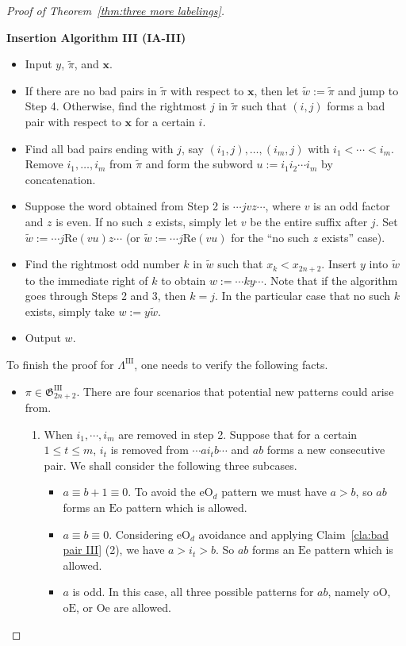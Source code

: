 \documentclass[11pt,reqno]{amsart}
\numberwithin{equation}{section}
\theoremstyle{plain}
\theoremstyle{definition}
\newcommand{\bx}{\mathbf{x}}
\newcommand{\fG}{\mathfrak{G}}
\newcommand{\GIII}{\fG^{\mathrm{III}}}
\newcommand{\LIII}{\Lambda^{\mathrm{III}}}
\def\oO{\mathrm{oO}}
\def\oE{\mathrm{oE}}
\def\eO{\mathrm{eO}}
\def\Eo{\mathrm{Eo}}
\def\Ee{\mathrm{Ee}}
\def\Oe{\mathrm{Oe}}
\begin{document}
\begin{proof}[Proof of Theorem~\ref{thm:three more labelings}]
    \begin{framed}
    	\begin{center}
    		{\bf Insertion Algorithm III (IA-III)}
    	\end{center}
    	\begin{itemize}
    		\item[Initiate] Input $y$, $\tilde{\pi}$, and $\bx$.
    		\item[Step 1] If there are no bad pairs in $\tilde{\pi}$ with respect to $\bx$, then let $\tilde{w}:=\tilde{\pi}$ and jump to Step 4. Otherwise, find the rightmost $j$ in $\tilde{\pi}$ such that $(i,j)$ forms a bad pair with respect to $\bx$ for a certain $i$.
    		\item[Step 2] Find all bad pairs ending with $j$, say $(i_1,j),\ldots,(i_m,j)$ with $i_1<\cdots<i_m$. Remove $i_1,\ldots,i_m$ from $\tilde{\pi}$ and form the subword $u:=i_1 i_2 \cdots i_m$ by concatenation.
    		\item[Step 3] Suppose the word obtained from Step 2 is $\cdots jvz\cdots$, where $v$ is an odd factor and $z$ is even. If no such $z$ exists, simply let $v$ be the entire suffix after $j$. Set $\tilde{w}:=\cdots j\mathrm{Re}(vu)z\cdots$ (or $\tilde{w}:=\cdots j\mathrm{Re}(vu)$ for the ``no such $z$ exists'' case).
    		\item[Step 4] Find the rightmost odd number $k$ in $\tilde{w}$ such that $x_k<x_{2n+2}$. Insert $y$ into $\tilde{w}$ to the immediate right of $k$ to obtain $w:=\cdots ky\cdots$. Note that if the algorithm goes through Steps 2 and 3, then $k=j$. In the particular case that no such $k$ exists, simply take $w:=y\tilde{w}$.
    		\item[End] Output $w$.
    	\end{itemize}
    \end{framed}
    
    To finish the proof for $\LIII$, one needs to verify the following facts. 
    \begin{itemize}
    	\item $\pi\in\GIII_{2n+2}$. There are four scenarios that potential new patterns could arise from. 
    	\begin{enumerate}
    		\item When $i_1,\cdots,i_m$ are removed in step 2. Suppose that for a certain $1\le t\le m$, $i_t$ is removed from $\cdots ai_tb\cdots$ and $ab$ forms a new consecutive pair. We shall consider the following three subcases.
    		\begin{itemize}
    			\item $a\equiv b+1\equiv 0$. To avoid the $\eO_d$ pattern we must have $a>b$, so $ab$ forms an $\Eo$ pattern which is allowed.
    			\item $a\equiv b\equiv 0$. Considering $\eO_d$ avoidance and applying Claim~\ref{cla:bad pair III} (2), we have $a>i_t>b$. So $ab$ forms an $\Ee$ pattern which is allowed.
    			\item $a$ is odd. In this case, all three possible patterns for $ab$, namely $\oO$, $\oE$, or $\Oe$ are allowed.
    		\end{itemize}
    		

\end{enumerate}
\end{itemize}
\end{proof}
\end{document}
